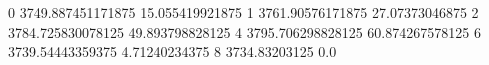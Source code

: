0 3749.887451171875 15.055419921875
1 3761.90576171875 27.07373046875
2 3784.725830078125 49.893798828125
4 3795.706298828125 60.874267578125
6 3739.54443359375 4.71240234375
8 3734.83203125 0.0
